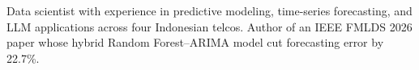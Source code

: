 \begin{justify}
\small{Data scientist with experience in predictive modeling, time-series forecasting, and LLM applications across four Indonesian telcos. Author of an IEEE FMLDS 2026 paper whose hybrid Random Forest--ARIMA model cut forecasting error by 22.7\%.}
\end{justify}
\vspace{-13pt}